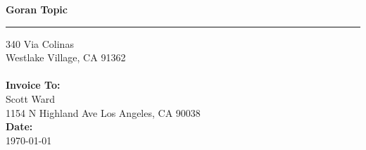 \documentclass{invoice}
\def \tab {\hspace*{3ex}}
\begin{document}
\hfil{\Huge\bf Goran Topic}\hfil
\bigskip\break
\hrule
340 Via Colinas \hfill  \\ 
Westlake Village, CA 91362 \hfill 
\\ \\
{\bf Invoice To:} \\
\tab Scott Ward \\ 
\tab 1154 N Highland Ave Los Angeles, CA 90038 \\ 
{\bf Date:} \\
\tab \today \\
\begin{invoiceTable}
\end{invoiceTable}
\end{document}

